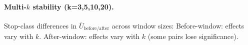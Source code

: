 \paragraph{Multi-$k$ stability (k=3,5,10,20).}
Stop-class differences in $\overline{U}_{\mathrm{before/after}}$ across window sizes:
Before-window: effects vary with $k$.
After-window: effects vary with $k$ (some pairs lose significance).
